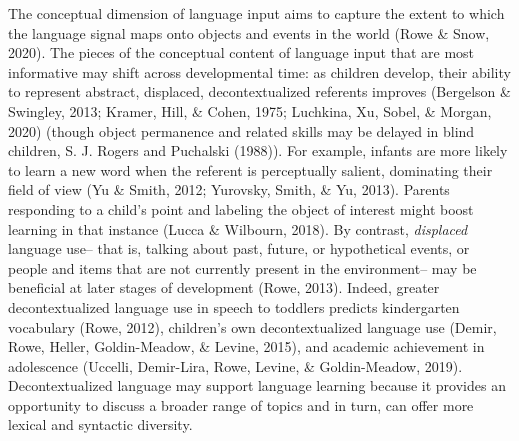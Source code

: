 \documentclass[
  man,floatsintext]{apa6}
\begin{document}
The conceptual dimension of language input aims to capture the extent to which the language signal maps onto objects and events in the world (Rowe \& Snow, 2020). The pieces of the conceptual content of language input that are most informative may shift across developmental time: as children develop, their ability to represent abstract, displaced, decontextualized referents improves (Bergelson \& Swingley, 2013; Kramer, Hill, \& Cohen, 1975; Luchkina, Xu, Sobel, \& Morgan, 2020) (though object permanence and related skills may be delayed in blind children, S. J. Rogers and Puchalski (1988)). For example, infants are more likely to learn a new word when the referent is perceptually salient, dominating their field of view (Yu \& Smith, 2012; Yurovsky, Smith, \& Yu, 2013). Parents responding to a child's point and labeling the object of interest might boost learning in that instance (Lucca \& Wilbourn, 2018). By contrast, \emph{displaced} language use-- that is, talking about past, future, or hypothetical events, or people and items that are not currently present in the environment-- may be beneficial at later stages of development (Rowe, 2013). Indeed, greater decontextualized language use in speech to toddlers predicts kindergarten vocabulary (Rowe, 2012), children's own decontextualized language use (Demir, Rowe, Heller, Goldin-Meadow, \& Levine, 2015), and academic achievement in adolescence (Uccelli, Demir-Lira, Rowe, Levine, \& Goldin-Meadow, 2019). Decontextualized language may support language learning because it provides an opportunity to discuss a broader range of topics and in turn, can offer more lexical and syntactic diversity.
\end{document}
